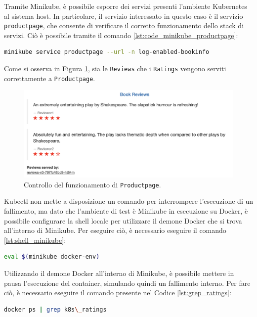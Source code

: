 Tramite Minikube, è possibile esporre dei servizi presenti l'ambiente Kubernetes al sistema host. In particolare, il servizio interessato in questo caso è il servizio \texttt{productpage}, che consente di verificare il corretto funzionamento dello stack di servizi. Ciò è possibile tramite il comando \ref{lst:code_minikube_productpage}:
\begin{lstlisting}[caption={Esposizione del servizio \texttt{productpage} al sistema host.}, label=lst:code_minikube_productpage, language=bash]
minikube service productpage --url -n log-enabled-bookinfo
\end{lstlisting}
Come si osserva in Figura \ref{fig:working}, sia le \texttt{Reviews} che i \texttt{Ratings} vengono serviti correttamente a \texttt{Productpage}.

\begin{figure}[h]
    \centering
    \includegraphics[width=\textwidth]{immagini/capitolo5/working.png}
    \caption{Controllo del funzionamento di \texttt{Productpage}.}
    \label{fig:working}
\end{figure}


Kubectl non mette a disposizione un comando per interrompere l'esecuzione di un fallimento, ma dato che l'ambiente di test è Minikube in esecuzione su Docker, è possibile configurare la shell locale per utilizzare il demone Docker che si trova all'interno di Minikube. Per eseguire ciò, è necessario eseguire il comando \ref{lst:shell_minikube}:

\begin{lstlisting}[caption={Passaggio al demone Docker in Minikube.}, label=lst:shell_minikube, language=bash]
eval $(minikube docker-env)
\end{lstlisting}

Utilizzando il demone Docker all'interno di Minikube, è possibile mettere in pausa l'esecuzione del container, simulando quindi un fallimento interno. Per fare ciò, è necessario eseguire il comando presente nel Codice \ref{lst:grep_ratings}: 
\begin{lstlisting}[caption={Ottenimento del container relativo ai Ratings.}, label=lst:grep_ratings, language=bash]
docker ps | grep k8s\_ratings
\end{lstlisting}

